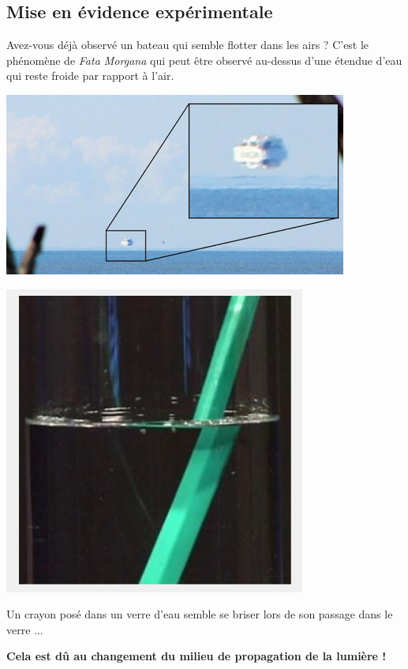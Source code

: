 \subsection{Mise en évidence expérimentale}
\begin{multicols}{2}
Avez-vous déjà observé un bateau qui semble flotter dans les airs ? C'est le phénomène de \textit{Fata Morgana} qui peut être observé au-dessus d'une étendue d'eau qui reste froide par rapport à l'air.
\begin{center}
     \includegraphics[scale=1]{Images/Cours/Chapitre_4/Mirage.PNG}
\end{center}
\begin{center}
     \includegraphics[scale=1]{Images/Cours/Chapitre_4/Crayon_brise.PNG}
\end{center}
Un crayon posé dans un verre d'eau semble se briser lors de son passage dans le verre ...
\end{multicols}
\textbf{Cela est dû au changement du milieu de propagation de la lumière !}
